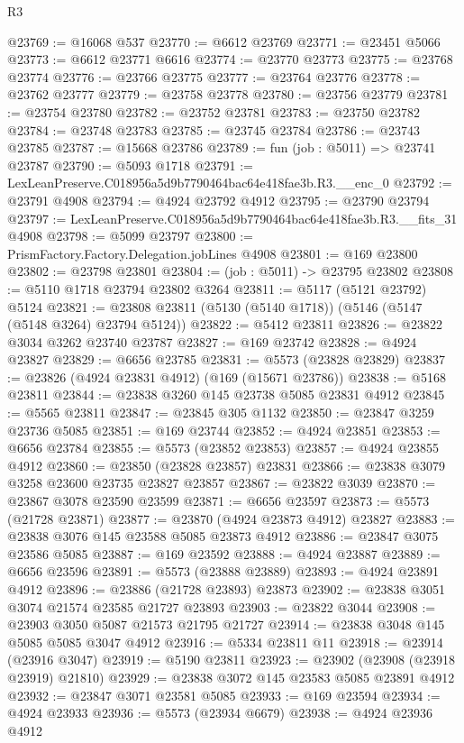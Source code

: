 \begin{lexlean}{R3}
\begin{coremodule}
@23769 := @16068 @537
@23770 := @6612 @23769
@23771 := @23451 @5066
@23773 := @6612 @23771 @6616
@23774 := @23770 @23773
@23775 := @23768 @23774
@23776 := @23766 @23775
@23777 := @23764 @23776
@23778 := @23762 @23777
@23779 := @23758 @23778
@23780 := @23756 @23779
@23781 := @23754 @23780
@23782 := @23752 @23781
@23783 := @23750 @23782
@23784 := @23748 @23783
@23785 := @23745 @23784
@23786 := @23743 @23785
@23787 := @15668 @23786
@23789 := fun (job : @5011) => @23741 @23787
@23790 := @5093 @1718
@23791 := LexLeanPreserve.C018956a5d9b7790464bac64e418fae3b.R3.__enc_0
@23792 := @23791 @4908
@23794 := @4924 @23792 @4912
@23795 := @23790 @23794
@23797 := LexLeanPreserve.C018956a5d9b7790464bac64e418fae3b.R3.__fits_31 @4908
@23798 := @5099 @23797
@23800 := PrismFactory.Factory.Delegation.jobLines @4908
@23801 := @169 @23800
@23802 := @23798 @23801
@23804 := (job : @5011) -> @23795 @23802
@23808 := @5110 @1718 @23794 @23802 @3264
@23811 := @5117 (@5121 @23792) @5124
@23821 := @23808 @23811 (@5130 (@5140 @1718)) (@5146 (@5147 (@5148 @3264) @23794 @5124))
@23822 := @5412 @23811
@23826 := @23822 @3034 @3262 @23740 @23787
@23827 := @169 @23742
@23828 := @4924 @23827
@23829 := @6656 @23785
@23831 := @5573 (@23828 @23829)
@23837 := @23826 (@4924 @23831 @4912) (@169 (@15671 @23786))
@23838 := @5168 @23811
@23844 := @23838 @3260 @145 @23738 @5085 @23831 @4912
@23845 := @5565 @23811
@23847 := @23845 @305 @1132
@23850 := @23847 @3259 @23736 @5085
@23851 := @169 @23744
@23852 := @4924 @23851
@23853 := @6656 @23784
@23855 := @5573 (@23852 @23853)
@23857 := @4924 @23855 @4912
@23860 := @23850 (@23828 @23857) @23831
@23866 := @23838 @3079 @3258 @23600 @23735 @23827 @23857
@23867 := @23822 @3039
@23870 := @23867 @3078 @23590 @23599
@23871 := @6656 @23597
@23873 := @5573 (@21728 @23871)
@23877 := @23870 (@4924 @23873 @4912) @23827
@23883 := @23838 @3076 @145 @23588 @5085 @23873 @4912
@23886 := @23847 @3075 @23586 @5085
@23887 := @169 @23592
@23888 := @4924 @23887
@23889 := @6656 @23596
@23891 := @5573 (@23888 @23889)
@23893 := @4924 @23891 @4912
@23896 := @23886 (@21728 @23893) @23873
@23902 := @23838 @3051 @3074 @21574 @23585 @21727 @23893
@23903 := @23822 @3044
@23908 := @23903 @3050 @5087 @21573 @21795 @21727
@23914 := @23838 @3048 @145 @5085 @5085 @3047 @4912
@23916 := @5334 @23811 @11
@23918 := @23914 (@23916 @3047)
@23919 := @5190 @23811
@23923 := @23902 (@23908 (@23918 @23919) @21810)
@23929 := @23838 @3072 @145 @23583 @5085 @23891 @4912
@23932 := @23847 @3071 @23581 @5085
@23933 := @169 @23594
@23934 := @4924 @23933
@23936 := @5573 (@23934 @6679)
@23938 := @4924 @23936 @4912

\end{coremodule}
\end{lexlean}
